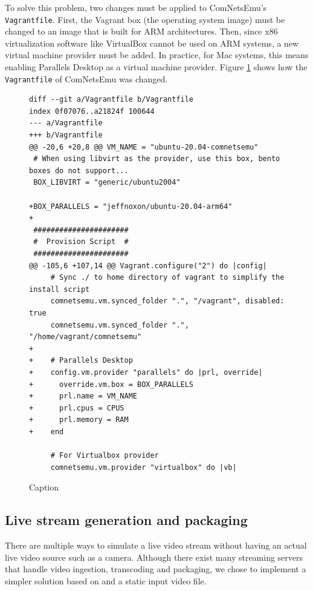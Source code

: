 To solve this problem, two changes must be applied to ComNetsEmu's \texttt{Vagrantfile}. First, the Vagrant box (the operating system image) must be changed to an image that is built for ARM architectures. Then, since x86 virtualization software like VirtualBox cannot be used on ARM systems, a new virtual machine provider must be added. In practice, for Mac systems, this means enabling Parallels Desktop as a virtual machine provider. Figure \ref{fig:vagrantfile} shows how the \texttt{Vagrantfile} of ComNetsEmu was changed.

\begin{figure}
    \centering
    \begin{verbatim}
diff --git a/Vagrantfile b/Vagrantfile
index 0f07076..a21824f 100644
--- a/Vagrantfile
+++ b/Vagrantfile
@@ -20,6 +20,8 @@ VM_NAME = "ubuntu-20.04-comnetsemu"
 # When using libvirt as the provider, use this box, bento boxes do not support...
 BOX_LIBVIRT = "generic/ubuntu2004"

+BOX_PARALLELS = "jeffnoxon/ubuntu-20.04-arm64"
+
 ######################
 #  Provision Script  #
 ######################
@@ -105,6 +107,14 @@ Vagrant.configure("2") do |config|
     # Sync ./ to home directory of vagrant to simplify the install script
     comnetsemu.vm.synced_folder ".", "/vagrant", disabled: true
     comnetsemu.vm.synced_folder ".", "/home/vagrant/comnetsemu"
+
+    # Parallels Desktop
+    config.vm.provider "parallels" do |prl, override|
+      override.vm.box = BOX_PARALLELS
+      prl.name = VM_NAME
+      prl.cpus = CPUS
+      prl.memory = RAM
+    end

     # For Virtualbox provider
     comnetsemu.vm.provider "virtualbox" do |vb|
    \end{verbatim}
    \caption{Caption}
    \label{fig:vagrantfile}
\end{figure}


\subsection{Live stream generation and packaging}
\label{sec:eval/testbed/packaging}

There are multiple ways to simulate a live video stream without having an actual live video source such as a camera. Although there exist many streaming servers that handle video ingestion, transcoding and packaging, we chose to implement a simpler solution based on \ffmpeg{} and a static input video file.

